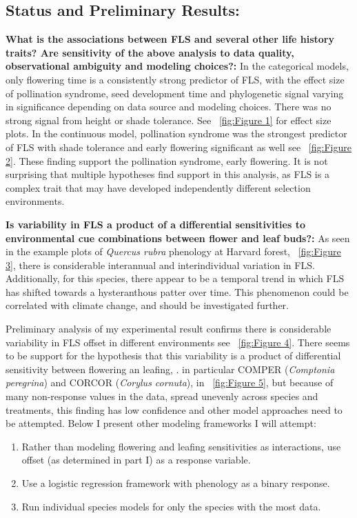 \documentclass{article}\usepackage[]{graphicx}\usepackage[]{color}
\begin{document}
\subsection*{Status and Preliminary Results:}
\indent\indent\textbf{What is the associations between FLS and several other life history traits?  Are sensitivity of the above analysis to data quality, observational ambiguity and modeling choices?:} In the categorical models, only flowering time is a consistently strong predictor of FLS, with the effect size of pollination syndrome, seed development time and phylogenetic signal varying in significance depending on data source and modeling choices. There was no strong signal from height or shade tolerance. See ~\ref{fig:Figure 1} for effect size plots.
In the continuous model, pollination syndrome was the strongest predictor of FLS with shade tolerance and early flowering significant as well see ~\ref{fig:Figure 2}. These finding support the pollination syndrome, early flowering. It is not surprising that multiple hypotheses find support in this analysis, as FLS is a complex trait that may have developed independently different selection environments.
\par\textbf{Is variability in FLS a product of a differential sensitivities to environmental cue combinations between flower and leaf buds?:} As seen in the  example plots of \textit{Quercus rubra} phenology at Harvard forest, ~\ref{fig:Figure 3}, there is considerable interannual and interindividual variation in FLS. Additionally, for this species, there appear to be a temporal trend in which FLS has shifted towards a hysteranthous patter over time. This phenomenon could be correlated with climate change, and should be investigated further.
\par Preliminary analysis of my experimental result confirms there is considerable variability in FLS offset in different environments see ~\ref{fig:Figure 4}.  There seems to be support for the hypothesis that this variability is a product of differential sensitivity between flowering an leafing, . in particular COMPER (\textit{Comptonia peregrina}) and CORCOR (\textit{Corylus cornuta}), in ~\ref{fig:Figure 5}, but because of many non-response values in the data, spread unevenly across species and treatments, this finding has low confidence and other model approaches need to be attempted. Below I present other modeling frameworks I will attempt:
\begin{enumerate}
\item Rather than modeling flowering and leafing sensitivities as interactions, use offset (as determined in part I) as a response variable.
\item Use a logistic regression framework with phenology as a binary response.
\item Run individual species models for only the species with the most data.
\end{enumerate}
\end{document}
